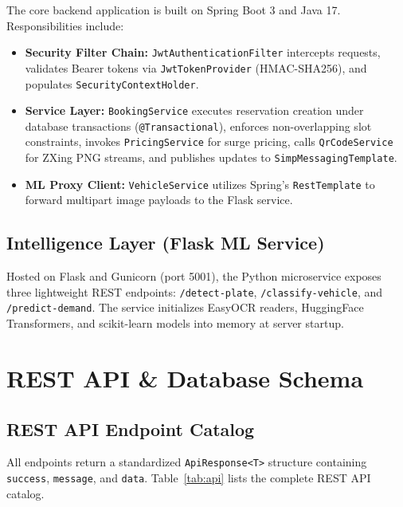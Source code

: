 \documentclass[conference,10pt]{IEEEtran}
\begin{document}
The core backend application is built on Spring Boot 3 and Java 17. Responsibilities include:
\begin{itemize}[leftmargin=*]
    \item \textbf{Security Filter Chain:} \texttt{JwtAuthenticationFilter} intercepts requests, validates Bearer tokens via \texttt{JwtTokenProvider} (HMAC-SHA256), and populates \texttt{SecurityContextHolder}.
    \item \textbf{Service Layer:} \texttt{BookingService} executes reservation creation under database transactions (\texttt{@Transactional}), enforces non-overlapping slot constraints, invokes \texttt{PricingService} for surge pricing, calls \texttt{QrCodeService} for ZXing PNG streams, and publishes updates to \texttt{SimpMessagingTemplate}.
    \item \textbf{ML Proxy Client:} \texttt{VehicleService} utilizes Spring's \texttt{RestTemplate} to forward multipart image payloads to the Flask service.
\end{itemize}

\subsection{Intelligence Layer (Flask ML Service)}

Hosted on Flask and Gunicorn (port 5001), the Python microservice exposes three lightweight REST endpoints: \texttt{/detect-plate}, \texttt{/classify-vehicle}, and \texttt{/predict-demand}. The service initializes EasyOCR readers, HuggingFace Transformers, and scikit-learn models into memory at server startup.

\section{REST API \& Database Schema}

\subsection{REST API Endpoint Catalog}

All endpoints return a standardized \texttt{ApiResponse<T>} structure containing \texttt{success}, \texttt{message}, and \texttt{data}. Table~\ref{tab:api} lists the complete REST API catalog.
\end{document}
